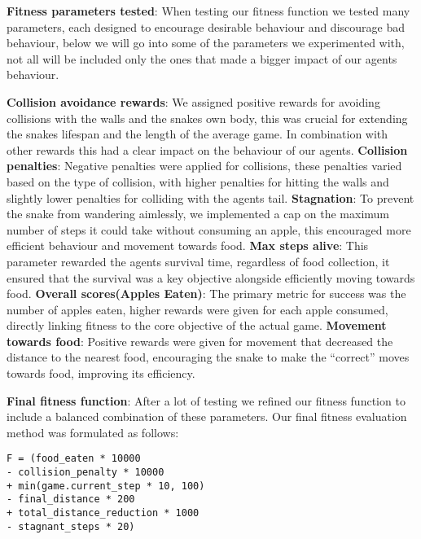 \documentclass[a4paper, twocolumn]{article}
\begin{document}
\textbf{Fitness parameters tested}: 
When testing our fitness function we tested many parameters, each designed to encourage desirable behaviour and discourage bad behaviour, below we will go into some of the parameters we experimented with, not all will be included only the ones that made a bigger impact of our agents behaviour. 

\textbf{Collision avoidance rewards}: We assigned positive rewards for avoiding collisions with the walls and the snakes own body, this was crucial for extending the snakes lifespan and the length of the average game. In combination with other rewards this had a clear impact on the behaviour of our agents.
\textbf{Collision penalties}: Negative penalties were applied for collisions, these penalties varied based on the type of collision, with higher penalties for hitting the walls and slightly lower penalties for colliding with the agents tail.
\textbf{Stagnation}: To prevent the snake from wandering aimlessly, we implemented a cap on the maximum number of steps it could take without consuming an apple, this encouraged more efficient behaviour and movement towards food.
\textbf{Max steps alive}: This parameter rewarded the agents survival time, regardless of food collection, it ensured that the survival was a key objective alongside efficiently moving towards food.
\textbf{Overall scores(Apples Eaten)}: The primary metric for success was the number of apples eaten, higher rewards were given for each apple consumed, directly linking fitness to the core objective of the actual game.
\textbf{Movement towards food}: Positive rewards were given for movement that decreased the distance to the nearest food, encouraging the snake to make the “correct” moves towards food, improving its efficiency.


\textbf{Final fitness function}: 
After a lot of testing we refined our fitness function to include a balanced combination of these parameters. Our final fitness evaluation method was formulated as follows: 


\begin{verbatim}
F = (food_eaten * 10000
- collision_penalty * 10000
+ min(game.current_step * 10, 100)
- final_distance * 200 
+ total_distance_reduction * 1000 
- stagnant_steps * 20)
\end{verbatim}
\end{document}
